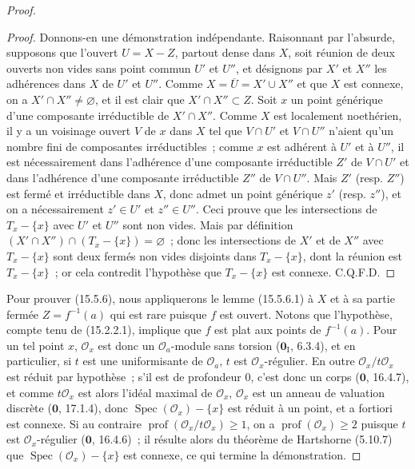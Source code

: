 \begin{proof}
\begin{proof}
Donnons-en une démonstration indépendante. Raisonnant par l'absurde, supposons que l'ouvert $U=X-Z$, partout dense dans $X$, soit réunion de deux ouverts non vides sans point commun $U'$ et $U''$, et désignons par $X'$ et $X''$ les adhérences dans $X$ de $U'$ et $U''$. Comme $X=\overline{U}=X'\cup X''$ et que $X$ est connexe, on a $X'\cap X''\ne\varnothing$, et il est clair que $X'\cap X''\subset Z$. Soit $x$ un point générique d'une composante irréductible de $X'\cap X''$. Comme $X$ est localement noethérien, il y a un voisinage ouvert $V$ de $x$ dans $X$ tel que $V\cap U'$ et $V\cap U''$ n'aient qu'un nombre fini de composantes irréductibles~; comme $x$ est adhérent à $U'$ et à $U''$, il est nécessairement dans l'adhérence d'une composante irréductible $Z'$ de $V\cap U'$ et dans l'adhérence d'une composante irréductible $Z''$ de $V\cap U''$. Mais $Z'$ (resp. $Z''$) est fermé et irréductible dans $X$, donc admet un point générique $z'$ (resp. $z''$), et on a nécessairement $z'\in U'$ et $z''\in U''$. Ceci prouve que les intersections de $T_x-\{x\}$ avec $U'$ et $U''$ sont non vides. Mais par définition $(X'\cap X'')\cap(T_x-\{x\})=\varnothing$~; donc les intersections de $X'$ et de $X''$ avec $T_x-\{x\}$ sont deux fermés non vides disjoints dans $T_x-\{x\}$, dont la réunion est $T_x-\{x\}$~; or cela contredit l'hypothèse que $T_x-\{x\}$ est connexe. C.Q.F.D.
\end{proof}
Pour prouver (15.5.6), nous appliquerons le lemme (15.5.6.1) à $X$ et à sa partie fermée $Z=f^{-1}(a)$ qui est rare puisque $f$ est ouvert. Notons que l'hypothèse, compte tenu de (15.2.2.1), implique que $f$ est plat aux points de $f^{-1}(a)$. Pour un tel point $x$, $\mathcal O_x$ est donc un $\mathcal O_a$-module sans torsion ($\mathbf{0}_{\mathrm I}$, 6.3.4), et en particulier, si $t$ est une uniformisante de $\mathcal O_a$, $t$ est $\mathcal O_x$-régulier. En outre $\mathcal O_x/t\mathcal O_x$ est réduit par hypothèse~; s'il est de profondeur $0$, c'est donc un corps ($\mathbf{0}$, 16.4.7), et comme $t\mathcal O_x$ est alors l'idéal maximal de $\mathcal O_x$, $\mathcal O_x$ est un anneau de valuation discrète ($\mathbf{0}$, 17.1.4), donc $\operatorname{Spec}(\mathcal O_x)-\{x\}$ est réduit à un point, et a fortiori est connexe. Si au contraire $\operatorname{prof}(\mathcal O_x/t\mathcal O_x)\geqslant 1$, on a $\operatorname{prof}(\mathcal O_x)\geqslant 2$ puisque $t$ est $\mathcal O_x$-régulier ($\mathbf{0}$, 16.4.6)~; il résulte alors du théorème de Hartshorne (5.10.7) que $\operatorname{Spec}(\mathcal O_x)-\{x\}$ est connexe, ce qui termine la démonstration.
\end{proof}


